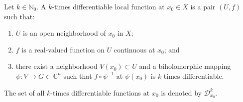 Let $k \in \mathbb{N}_0$. A $k$-times differentiable local function at $x_0 \in X$ is a pair $(U, f)$ such that:

\begin{enumerate}
  \item $U$ is an open neighborhood of $x_0$ in $X$;
  \item $f$ is a real-valued function on $U$ continuous at $x_0$; and
  \item there exist a neighborhood $V(x_0) \subset U$ and a biholomorphic mapping $\psi: V \to G \subset \mathbb{C}^n$ such that $f \circ \psi^{-1}$ at $\psi(x_0)$ is $k$-times differentiable.
\end{enumerate}

The set of all $k$-times differentiable functions at $x_0$ is denoted by $\mathcal{D}_{x_0}^k$.
